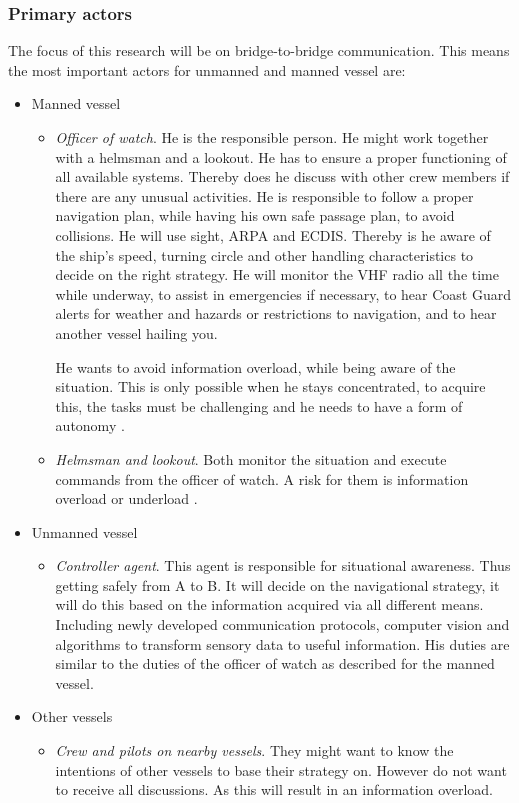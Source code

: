 \subsubsection{Primary actors}
The focus of this research will be on bridge-to-bridge communication. This means the most important actors for unmanned and manned vessel are:
\begin{itemize}
	\item Manned vessel
	\begin{itemize}
		\item \emph{Officer of watch}. He is the responsible person. He might work together with a helmsman and a lookout. He has to ensure a proper functioning of all available systems. Thereby does he discuss with other crew members if there are any unusual activities. He is responsible to follow a proper navigation plan, while having his own safe passage plan, to avoid collisions. He will use sight, \acf{ARPA} and \acf{ECDIS}. Thereby is he aware of the ship's speed, turning circle and other handling characteristics to decide on the right strategy. He will monitor the \ac{VHF} radio all the time while underway, to assist in emergencies if necessary, to hear Coast Guard alerts for weather and hazards or restrictions to navigation, and to hear another vessel hailing you.
		
		He wants to avoid information overload, while being aware of the situation. This is only possible when he stays concentrated, to acquire this, the tasks must be challenging and he needs to have a form of autonomy \cite{Porathe2014}.
	
		\item \emph{Helmsman and lookout}. Both monitor the situation and execute commands from the officer of watch. A risk for them is information overload or underload \cite{Neerincx2008}.
	\end{itemize}
		
	\item Unmanned vessel
	\begin{itemize}
		\item \emph{Controller agent}. This agent is responsible for situational awareness. Thus getting safely from A to B. It will decide on the navigational strategy, it will do this based on the information acquired via all different means. Including newly developed communication protocols, computer vision and algorithms to transform sensory data to useful information. His duties are similar to the duties of the officer of watch as described for the manned vessel.
	\end{itemize}

	\item Other vessels
	\begin{itemize}
		\item \emph{Crew and pilots on nearby vessels}. They might want to know the intentions of other vessels to base their strategy on. However do not want to receive all discussions. As this will result in an information overload.
	\end{itemize}
	
\end{itemize}

